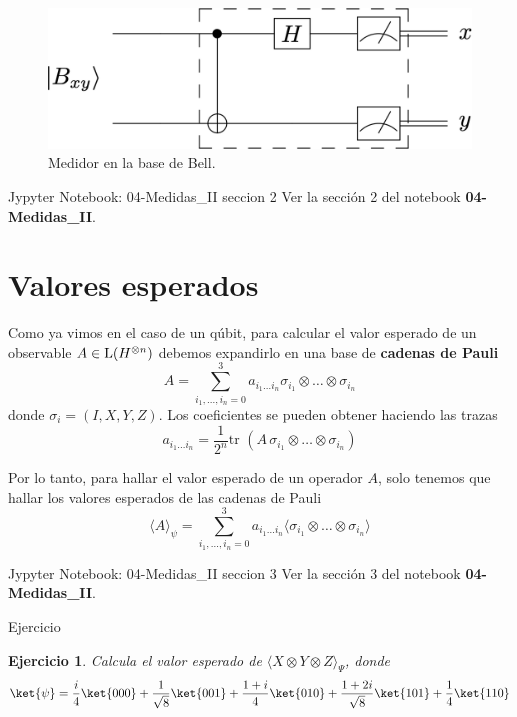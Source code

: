 \documentclass[a4paper,11pt]{book} %
\newtheorem{ejercicio_contador}{Ejercicio}
\newcommand{\Ejercicio}[1]{
		\begin{mybox_gray}{Ejercicio} 
			\begin{ejercicio_contador}
				 #1 
			\end{ejercicio_contador} 
		\end{mybox_gray}
	}
\numberwithin{equation}{chapter}
\begin{document}
	\begin{figure}[H]
	\centering 
	\includegraphics[width=0.4\linewidth]{Figuras/Fig_medidas2_Bell_meter}
	\caption{Medidor en la base de Bell. }
	\label{Fig_medidas2_Bell_meter}
	\end{figure}

	\begin{mybox_orange}{Jypyter Notebook: 04-Medidas\_II seccion 2}
	Ver la sección 2 del notebook \textbf{04-Medidas\_II}.
	\end{mybox_orange}


    \section{Valores esperados}

Como ya vimos en el caso de un qúbit, para calcular el valor esperado de un observable $A\in {\rm L}(H^{\otimes n})$ debemos expandirlo en una base de \textbf{cadenas de Pauli}
	\begin{equation} \label{ec_medidas2_A_en_cadenas_de_Pauli}
	A = \sum_{i_1,...,i_n=0}^3 a_{i_1\ldots i_n} \sigma_{i_1}\otimes \ldots \otimes \sigma_{i_n}
	\end{equation}
donde $\sigma_i = (I,X,Y,Z)$. Los coeficientes se pueden obtener haciendo las trazas
	\begin{equation} \label{ec_medidas2_coef_A_en_cadenas_de_Pauli}
	a_{i_1\ldots i_n} =\frac{1}{2^n} \text{tr } (A \,  \sigma_{i_1}\otimes \ldots  \otimes\sigma_{i_n})
	\end{equation}

Por lo tanto, para hallar el valor esperado de un operador $A$, solo tenemos que hallar los valores esperados de las cadenas de Pauli
	\begin{equation}
	\langle A \rangle_{\psi} =  \sum_{i_1,...,i_n=0}^3 a_{i_1\ldots i_n} \langle \sigma_{i_1}\otimes \ldots   \otimes\sigma_{i_n}\rangle
	\end{equation}

	\begin{mybox_orange}{Jypyter Notebook: 04-Medidas\_II seccion 3}
	Ver la sección 3 del notebook \textbf{04-Medidas\_II}.
	\end{mybox_orange}

	\Ejercicio{
	Calcula el valor esperado de $\langle X\otimes Y\otimes Z\rangle_\Psi$, donde 
	$$
	\ket{\psi} = \frac{i}{4} \ket{000}+\frac{1}{\sqrt{8}} \ket{001}+\frac{1+i}{4} \ket{010}+
	\frac{1+2i}{\sqrt{8}}\ket{101}+\frac{1}{4} \ket{110}
	$$   
	}
	
\end{document}

